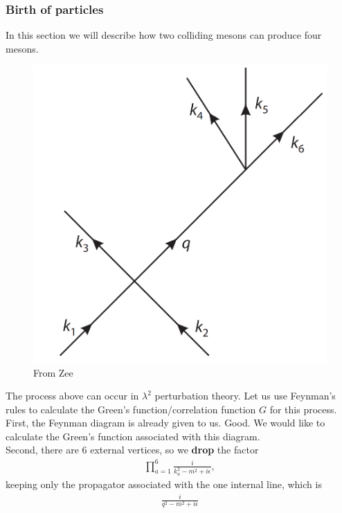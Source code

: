 \documentclass{book}
\theoremstyle{definition}
\newcommand{\f}[2]{\frac{#1}{#2}}
\begin{document}
\subsubsection{Birth of particles}



In this section we will describe how two colliding mesons can produce four mesons. 
\begin{figure}[!htb]
	\centering
	\includegraphics[scale=0.3]{birth}
	\caption{From Zee}
\end{figure}


The process above can occur in $\lambda^2$ perturbation theory. Let us use Feynman's rules to calculate the Green's function/correlation function $G$ for this process. \\

First, the Feynman diagram is already given to us. Good. We would like to calculate the Green's function associated with this diagram.\\

Second, there are $6$ external vertices, so we \textbf{drop} the factor 
\begin{align}
\prod^6_{a=1}\f{i}{k_a^2 - m^2 + i\epsilon},
\end{align}
keeping only the propagator associated with the one internal line, which is
\begin{align}
\f{i}{q^2 - m^2 + i\epsilon}
\end{align} \\
\end{document}
